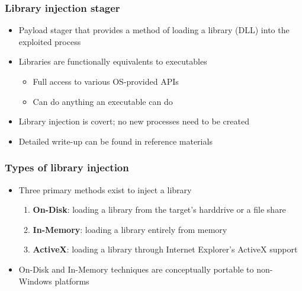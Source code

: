 \documentclass{beamer}
\newenvironment{sitemize}{\vspace{1mm}\begin{itemize}\itemsep 4pt\small}{\end{itemize}}
\newenvironment{senumerate}{\vspace{1mm}\begin{enumerate}\itemsep 4pt\small}{\end{enumerate}}
\begin{document}
\begin{frame}[t]
    \frametitle{Library injection stager}

    \begin{sitemize}
        \item Payload stager that provides a method of loading a
        library (DLL) into the exploited process

        \pause
        \item Libraries are functionally equivalents to executables
        \begin{sitemize}
            \item Full access to various OS-provided APIs
            \item Can do anything an executable can do
        \end{sitemize}

        \pause
        \item Library injection is covert; no new processes
        need to be created

        \pause
        \item Detailed write-up can be found in reference materials

    \end{sitemize}
\end{frame}

\begin{frame}[t]
    \frametitle{Types of library injection}

    \begin{sitemize}
        \item Three primary methods exist to inject a library
        \begin{senumerate}
            \item \textbf{On-Disk}: loading a library from the target's
            harddrive or a file share
            \item \textbf{In-Memory}: loading a library entirely from memory
            \item \textbf{ActiveX}: loading a library through Internet
            Explorer's ActiveX support
        \end{senumerate}
        \item On-Disk and In-Memory techniques are conceptually
        portable to non-Windows platforms
    \end{sitemize}
\end{frame}
\end{document}
